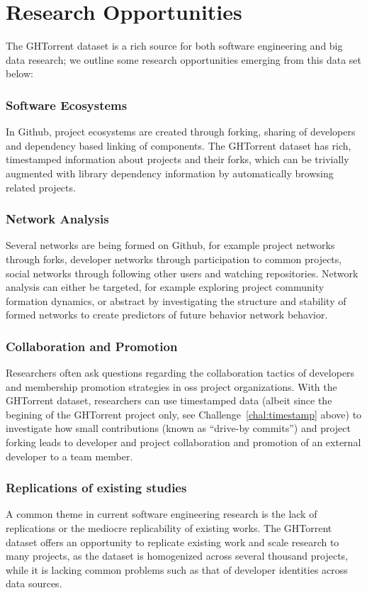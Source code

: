 \documentclass[conference]{IEEEtran}
\begin{document}
\section{Research Opportunities}

The GHTorrent dataset is a rich source for both software engineering and
big data research; we outline some research opportunities emerging from
this data set below:

\subsubsection{Software Ecosystems} In Github, project ecosystems are created
through forking, sharing of developers and dependency based linking of
components. The GHTorrent dataset has rich, timestamped information about 
projects and their forks, which can be trivially augmented with library
dependency information by automatically browsing related projects.

\subsubsection{Network Analysis} Several networks are being formed on
Github, for example project networks through forks, developer networks
through participation to common projects, social networks through following
other users and watching repositories. Network analysis can either
be targeted, for example exploring project community formation dynamics, or
abstract by investigating the structure and stability of formed networks to
create predictors of future behavior network behavior.

\subsubsection{Collaboration and Promotion} Researchers often ask questions
regarding the collaboration tactics of developers and membership promotion
strategies in {\sc oss} project organizations.  With the GHTorrent dataset,
researchers can use timestamped data (albeit since the begining of the GHTorrent
project only, see Challenge~\ref{chal:timestamp} above) to investigate
how small contributions (known as ``drive-by commits'') and project
forking leads to developer and project collaboration and promotion of an
external developer to a team member.

\subsubsection{Replications of existing studies} A common theme in current
software engineering research is the lack of replications or the
mediocre replicability of existing works. The GHTorrent dataset offers
an opportunity to replicate existing work and scale research to many
projects, as the dataset is homogenized across several thousand projects,
while it is lacking common problems such as that of developer identities
across data sources.
\end{document}
